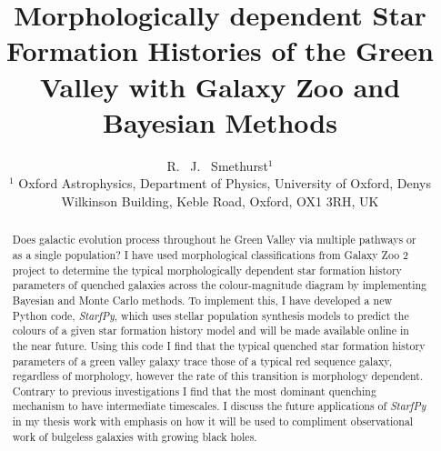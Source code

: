 \documentclass{mn2e}
\begin{document}
\title[Bayesian methods with Galaxy Zoo]{Morphologically dependent Star Formation Histories of the Green Valley with Galaxy Zoo and Bayesian Methods}
\author[Smethurst et al. 2014]{R. ~J. ~Smethurst$^1$
\\ $^1$ Oxford Astrophysics, Department of Physics, University of Oxford, Denys Wilkinson Building, Keble Road, Oxford, OX1 3RH, UK }

\maketitle

\begin{abstract}
Does galactic evolution process throughout he Green Valley via multiple pathways or as a single population? I have used morphological classifications from Galaxy Zoo 2 project to determine the typical morphologically dependent star formation history parameters of quenched galaxies across the colour-magnitude diagram by implementing Bayesian and Monte Carlo methods. To implement this, I have developed a new Python code, \emph{StarfPy}, which uses stellar population synthesis models to predict the colours of a given star formation history model and will be made available online in the near future. Using this code I find that the typical quenched star formation history parameters of a green valley galaxy trace those of a typical red sequence galaxy, regardless of morphology, however the rate of this transition is morphology dependent. Contrary to previous investigations I find that the most dominant quenching mechanism to have intermediate timescales. I discuss the future applications of \emph{StarfPy} in my thesis work with emphasis on how it will be used to compliment observational work of bulgeless galaxies with growing black holes. 
\end{abstract}
\end{document}
